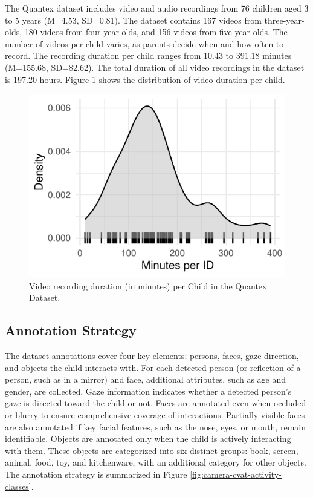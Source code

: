 \documentclass[
  man,floatsintext]{apa6}
\begin{document}
The Quantex dataset includes video and audio recordings from 76 children aged 3 to 5 years (M=4.53, SD=0.81). The dataset contains 167 videos from three-year-olds, 180 videos from four-year-olds, and 156 videos from five-year-olds. The number of videos per child varies, as parents decide when and how often to record. The recording duration per child ranges from 10.43 to 391.18 minutes (M=155.68, SD=82.62). The total duration of all video recordings in the dataset is 197.20 hours. Figure \ref{fig:quantex-minutes-per-child} shows the distribution of video duration per child.

\begin{figure}

{\centering \includegraphics{Quantex_interaction_paper_files/figure-latex/quantex-minutes-per-child-1} 

}

\caption{Video recording duration (in minutes) per Child in the Quantex Dataset.}\label{fig:quantex-minutes-per-child}
\end{figure}

\subsection{Annotation Strategy}\label{annotation-strategy}

The dataset annotations cover four key elements: persons, faces, gaze direction, and objects the child interacts with. For each detected person (or reflection of a person, such as in a mirror) and face, additional attributes, such as age and gender, are collected. Gaze information indicates whether a detected person's gaze is directed toward the child or not. Faces are annotated even when occluded or blurry to ensure comprehensive coverage of interactions. Partially visible faces are also annotated if key facial features, such as the nose, eyes, or mouth, remain identifiable. Objects are annotated only when the child is actively interacting with them. These objects are categorized into six distinct groups: book, screen, animal, food, toy, and kitchenware, with an additional category for other objects. The annotation strategy is summarized in Figure \ref{fig:camera-cvat-activity-classes}.
\end{document}
